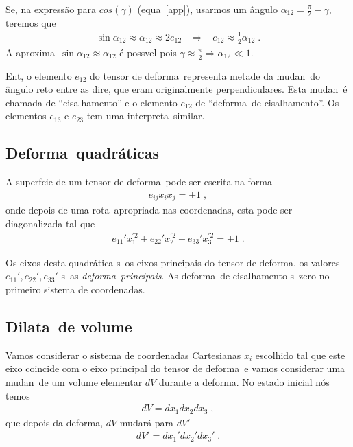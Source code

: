 \begin{itemize}
Se, na express\~ao para $cos(\gamma)$ (equa\cao\ \ref{app}), 
usarmos um \^angulo $\alpha_{12} = \frac{\pi}{2} - \gamma$, teremos que
\begin{eqnarray}
\sin \alpha_{12} \approx \alpha_{12} \approx 2e_{12} \;\;\;\Rightarrow
\;\;\; e_{12} \approx \frac{1}{2} \alpha_{12} \; .
\end{eqnarray}
A aproxima\cao\ $\sin \alpha_{12} \approx \alpha_{12}$ \'e
poss\ih vel pois $\gamma \approx \frac{\pi}{2} \Rightarrow
\alpha_{12} \ll 1$.

Ent\ao, o elemento $e_{12}$ do tensor de deforma\cao\ representa
metade da mudan\ca\ do \^angulo reto entre as dire\coes, que
eram originalmente perpendiculares. Esta mudan\ca\ \'e chamada
de ``cisalhamento''  e o elemento $e_{12}$ de ``deforma\cao\ de
cisalhamento''. Os elementos $e_{13}$ e $e_{23}$ tem uma
interpreta\cao\ similar.

\end{itemize}

\subsection{Deforma\coes\ quadr\'aticas}

A superf\ih cie de um tensor de deforma\cao\ pode ser escrita
na forma
\begin{eqnarray}
e_{ij} x_i x_j = \pm 1 \; ,
\end{eqnarray}
onde depois de uma rota\cao\ apropriada nas coordenadas, esta
pode ser diagonalizada tal que
\begin{eqnarray}
e_{11}' x_1^{'2}+e_{22}' x_2^{'2}+e_{33}' x_3^{'2} = \pm 1 \; .
\end{eqnarray}

Os eixos desta quadr\'atica s\ao\ os eixos principais do tensor
de deforma\cao, os valores $e_{11}', e_{22}',  e_{33}'$ s\ao\ as
{\it deforma\coes\ principais}. As deforma\coes\ de cisalhamento
s\ao\ zero no primeiro sistema de coordenadas.


\subsection{Dilata\cao\ de volume}

Vamos considerar o sistema de coordenadas Cartesianas $x_i$
escolhido tal que este eixo coincide com o eixo principal do
tensor de deforma\cao\ e vamos considerar uma mudan\ca\ de
um volume elementar $dV$ durante a deforma\cao. No estado
inicial n\'os temos
\begin{eqnarray}
dV = dx_1 dx_2 dx_3 \; ,
\end{eqnarray}
que depois da deforma\cao, $dV$ mudar\'a para $dV'$
\begin{eqnarray}
dV' = dx_1' dx_2' dx_3' \; .
\end{eqnarray}

